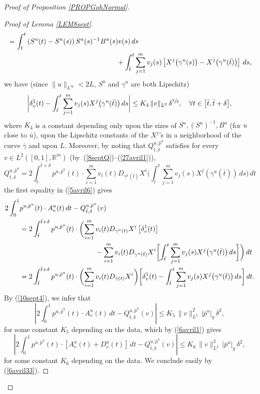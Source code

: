 \documentclass[JEP,XML,SOM,Unicode,NoFloatCountersInSection,published]{cedram}
\newcommand\R{\mathbb R}
\theoremstyle{definition}
\begin{document}
\begin{proof}[Proof of Proposition \ref{PROPGohNormal}]
\begin{proof}[Proof of Lemma \ref{LEM8sept}]
\begin{align*}
& =  \int_{\bar{t}}^t \left(S^u(t) -S^u(s) \right) S^u(s)^{-1} B^u(s) v(s) \, ds \\
& \hspace*{5.5cm} + \int_{\bar{t}}^t \sum_{j=1}^m v_j(s) \left[ X^j \bigl(\gamma^u(s)\bigr) - X^j \bigl(\gamma^u(\bar{t})\bigr)\right] \, ds,
\end{align*}
we have (since $\|u\|_{L^{\infty}}< 2L$, $S^u$ and $\gamma^u$ are both Lipschitz)
\begin{equation}\label{10sept4}
\biggl| \delta_v^1 (t) -\int_{\bar{t}}^t \sum_{j=1}^m v_j(s) X^j \bigl(\gamma^u(\bar{t})\bigr) \,ds \biggr| \leq K_4 \, \|v\|_{L^2} \, \delta^{\sfrac{3}{2}}, \quad \forall t \in \bigl[\bar{t},\bar{t}+\delta\bigr],
\end{equation}
where $K_4$ is a constant depending only upon the sizes of $S^u, (S^u)^{-1}, B^u$ (for $u$ close to $\bar{u}$), upon the Lipschitz constants of the $X^j$'s in a neighborhood of the curve $\bar{\gamma}$ and upon $L$. Moreover, by noting that $Q^{u,\bar{p}^u}_{\bar{t},\delta}$ satisfies for every $v\in L^2([0,1],\R^m)$ (by~(\ref{8septQ})--(\ref{27avril1})),
\[
Q^{u,\bar{p}^u}_{\bar{t},\delta} = 2 \int_{\bar{t}}^{\bar{t}+\delta} p^{u,\bar{p}^u}(t) \cdot \sum_{i=1}^m v_i(t) D_{\gamma^u(\bar{t})} X^i \biggl(\int_{\bar{t}}^t \sum_{j=1}^m v_j(s) X^j(\gamma^u(\bar{t})) \, ds \biggr) \, dt
\]
the first equality in (\ref{5avril6}) gives
\begin{align*}
2 \int_{0}^{1}& p^{u,\bar{p}^u}(t) \cdot A^u_v(t)\, dt - Q^{u,\bar{p}^u}_{\bar{t},\delta}(v) \\
& =  2 \int_{\bar{t}}^{\bar{t}+\delta} p^{u,\bar{p}^u}(t) \cdot \biggl(\sum_{i=1}^m v_i(t) D_{\gamma^u(t)} X^i \left[\delta_v^1(t)\right] \\
& \hspace*{3.8cm} - \sum_{i=1}^m v_i(t) D_{\gamma^u(\bar{t})} X^i \biggl[ \int_{\bar{t}}^t \sum_{j=1}^m v_j(s) X^j\bigl(\gamma^u(\bar{t}) \bigr) \, ds \biggr] \biggr) \, dt \\
& =  2 \int_{\bar{t}}^{\bar{t}+\delta} p^{u,\bar{p}^u}(t) \cdot \biggl(\sum_{i=1}^m v_i(t) D_{\bar{\gamma}(t)} X^i \biggr) \biggl[ \delta_v^1(t) - \int_{\bar{t}}^t \sum_{j=1}^m v_j(s) X^j\bigl(\gamma^u(\bar{t}) \bigr) \, ds \biggr] \, dt.
\end{align*}
By (\ref{10sept4}), we infer that
\[
\left| 2 \int_{0}^{1} p^{u,\bar{p}^u}(t) \cdot A^u_v(t)\, dt - Q^{u,\bar{p}^u}_{\bar{t},\delta}(v) \right| \leq K_5 \, \|v\|_{L^2}^2 \, \left|\bar{p}^u\right|_{y} \, \delta^{2},
\]
for some constant $K_5$ depending on the data, which by (\ref{6avril1}) gives
\[
\left| 2 \int_0^1 p^{u,\bar{p}^u}(t) \cdot \left[ A^u_v(t)+ D^u_v(t)\right] \, dt - Q^{u,\bar{p}^u}_{\bar{t},\delta}(v) \right| \leq K_6 \, \|v\|_{L^2}^2 \, \left|\bar{p}^u\right|_{y} \, \delta^{2},
\]
for some constant $K_6$ depending on the data. We conclude easily by (\ref{6avril33}).
\end{proof}


\end{proof}
\end{document}
